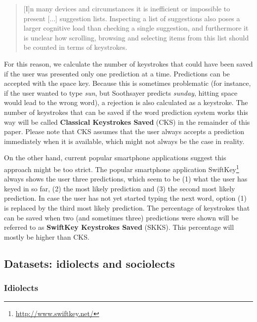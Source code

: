 \documentclass[12pt]{article}
\begin{document}
\begin{quotation}
[I]n many devices and circumstances it is inefficient or impossible to present [...] suggestion lists. Inspecting a list of suggestions also poses a larger cognitive load than checking a single suggestion, and furthermore it is unclear how scrolling, browsing and selecting items from this list should be counted in terms of keystrokes.
\end{quotation}

For this reason, we calculate the number of keystrokes that could have been saved if the user was presented only one prediction at a time. Predictions can be accepted with the space key. Because this is sometimes problematic (for instance, if the user wanted to type \emph{sun}, but Soothsayer predicts \emph{sunday}, hitting space would lead to the wrong word), a rejection is also calculated as a keystroke. The number of keystrokes that can be saved if the word prediction system works this way will be called \textbf{Classical Keystrokes Saved} (CKS) in the remainder of this paper. Please note that CKS assumes that the user always accepts a prediction immediately when it is available, which might not always be the case in reality.

On the other hand, current popular smartphone applications suggest this approach might be too strict. The popular smartphone application SwiftKey\footnote{\url{http://www.swiftkey.net/}} always shows the user three predictions, which seem to be (1) what the user has keyed in so far, (2) the most likely prediction and (3) the second most likely prediction. In case the user has not yet started typing the next word, option (1) is replaced by the third most likely prediction. The percentage of keystrokes that can be saved when two (and sometimes three) predictions were shown will be referred to as \textbf{SwiftKey Keystrokes Saved} (SKKS). This percentage will mostly be higher than CKS.

\subsection{Datasets: idiolects and sociolects} \label{model}

\subsubsection{Idiolects} \label{idiolects}
\end{document}
